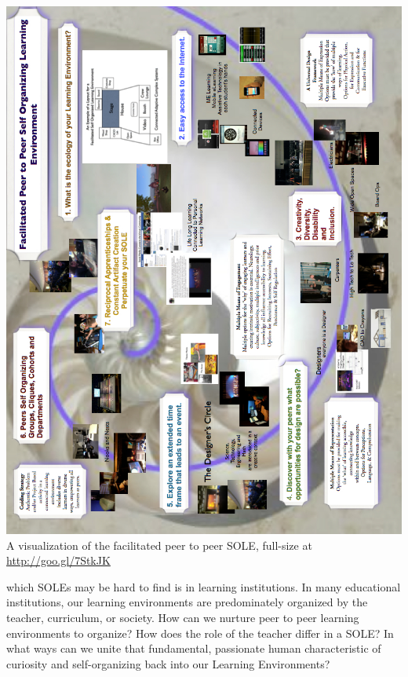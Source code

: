 \clearpage
\begin{vplace}[0.5]
\noindent \includegraphics[width=\textwidth]{../pictures/sole-l.jpg}
A visualization of the facilitated peer to peer SOLE, full-size
at \url{http://goo.gl/7StkJK}
\end{vplace}
\clearpage

\noindent which SOLEs may be hard to find is in learning
institutions. In many educational institutions, our learning
environments are predominately organized by the teacher, curriculum,
or society. How can we nurture peer to peer learning environments to
organize? How does the role of the teacher differ in a SOLE? In what
ways can we unite that fundamental, passionate human characteristic of
curiosity and self-organizing back into our Learning Environments?




